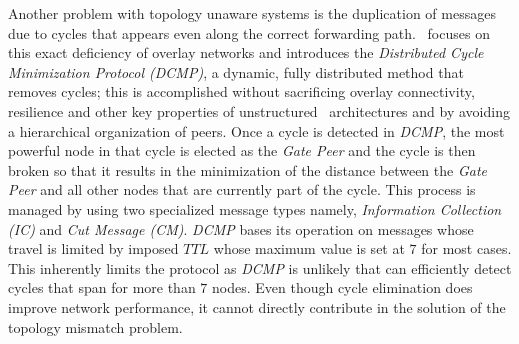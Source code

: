 Another problem with topology unaware
systems is the duplication of messages due to cycles that appears 
 even along the correct forwarding path. 
\cite{ZKB2008}~focuses on this exact deficiency
of overlay networks and introduces the \emph{Distributed Cycle Minimization Protocol
(DCMP)}, a dynamic, fully distributed method that removes cycles;
this is accomplished without sacrificing
overlay connectivity, resilience and other key properties of unstructured
\p\ architectures and by avoiding a hierarchical organization of peers. 
Once a cycle is detected in {\it DCMP}, the most powerful node in that cycle 
is elected as the \emph{Gate Peer} and the cycle is then broken 
so that it results in the minimization of the distance between the 
\emph{Gate Peer} and all other nodes that are currently part of the cycle. 
This process is managed by using two specialized message types 
namely, \emph{Information Collection (IC)} and \emph{Cut Message (CM)}. 
\emph{DCMP} bases its operation on messages whose travel is limited by 
imposed $TTL$ whose maximum value is set at  $7$ for most cases. 
This inherently limits the protocol as \emph{DCMP} is unlikely that 
can efficiently detect cycles that span for more than $7$ nodes.
Even though cycle elimination does improve network performance, 
it cannot 
directly contribute in the solution of 
the topology mismatch problem.
%
%
